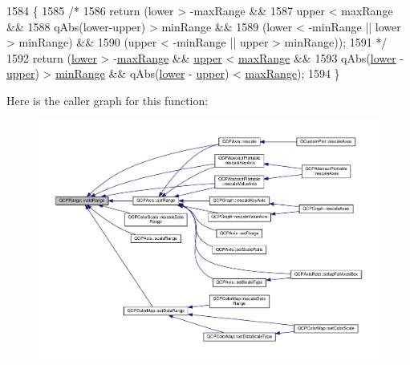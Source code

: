 \begin{DoxyCode}
1584                                                     \{
1585   \textcolor{comment}{/*}
1586 \textcolor{comment}{  return (lower > -maxRange &&}
1587 \textcolor{comment}{          upper < maxRange &&}
1588 \textcolor{comment}{          qAbs(lower-upper) > minRange &&}
1589 \textcolor{comment}{          (lower < -minRange || lower > minRange) &&}
1590 \textcolor{comment}{          (upper < -minRange || upper > minRange));}
1591 \textcolor{comment}{          */}
1592   \textcolor{keywordflow}{return} (\hyperlink{class_q_c_p_range_aa3aca3edb14f7ca0c85d912647b91745}{lower} > -\hyperlink{class_q_c_p_range_a5ca51e7a2dc5dc0d49527ab171fe1f4f}{maxRange} && \hyperlink{class_q_c_p_range_ae44eb3aafe1d0e2ed34b499b6d2e074f}{upper} < \hyperlink{class_q_c_p_range_a5ca51e7a2dc5dc0d49527ab171fe1f4f}{maxRange} &&
1593           qAbs(\hyperlink{class_q_c_p_range_aa3aca3edb14f7ca0c85d912647b91745}{lower} - \hyperlink{class_q_c_p_range_ae44eb3aafe1d0e2ed34b499b6d2e074f}{upper}) > \hyperlink{class_q_c_p_range_ab46d3bc95030ee25efda41b89e2b616b}{minRange} && qAbs(\hyperlink{class_q_c_p_range_aa3aca3edb14f7ca0c85d912647b91745}{lower} - 
      \hyperlink{class_q_c_p_range_ae44eb3aafe1d0e2ed34b499b6d2e074f}{upper}) < \hyperlink{class_q_c_p_range_a5ca51e7a2dc5dc0d49527ab171fe1f4f}{maxRange});
1594 \}
\end{DoxyCode}


Here is the caller graph for this function\+:\nopagebreak
\begin{figure}[H]
\begin{center}
\leavevmode
\includegraphics[width=350pt]{class_q_c_p_range_ab38bd4841c77c7bb86c9eea0f142dcc0_icgraph}
\end{center}
\end{figure}


